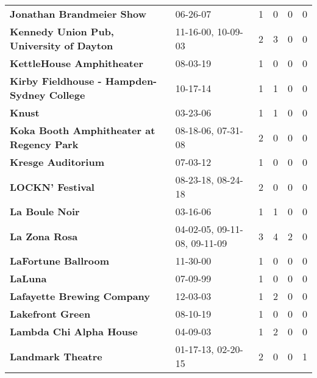 \begin{supertabular}{llllll}
                                    \textbf{Jonathan Brandmeier Show} &                      06-26-07 &  1 &   0 &  0 &  0 \\
                     \textbf{Kennedy Union Pub, University of Dayton} &            11-16-00, 10-09-03 &  2 &   3 &  0 &  0 \\
                                    \textbf{KettleHouse Amphitheater} &                      08-03-19 &  1 &   0 &  0 &  0 \\
                   \textbf{Kirby Fieldhouse - Hampden-Sydney College} &                      10-17-14 &  1 &   1 &  0 &  0 \\
                                                       \textbf{Knust} &                      03-23-06 &  1 &   1 &  0 &  0 \\
                     \textbf{Koka Booth Amphitheater at Regency Park} &            08-18-06, 07-31-08 &  2 &   0 &  0 &  0 \\
                                           \textbf{Kresge Auditorium} &                      07-03-12 &  1 &   0 &  0 &  0 \\
                                             \textbf{LOCKN' Festival} &            08-23-18, 08-24-18 &  2 &   0 &  0 &  0 \\
                                               \textbf{La Boule Noir} &                      03-16-06 &  1 &   1 &  0 &  0 \\
                                                \textbf{La Zona Rosa} &  04-02-05, 09-11-08, 09-11-09 &  3 &   4 &  2 &  0 \\
                                          \textbf{LaFortune Ballroom} &                      11-30-00 &  1 &   0 &  0 &  0 \\
                                                      \textbf{LaLuna} &                      07-09-99 &  1 &   0 &  0 &  0 \\
                                   \textbf{Lafayette Brewing Company} &                      12-03-03 &  1 &   2 &  0 &  0 \\
                                             \textbf{Lakefront Green} &                      08-10-19 &  1 &   0 &  0 &  0 \\
                                      \textbf{Lambda Chi Alpha House} &                      04-09-03 &  1 &   2 &  0 &  0 \\
                                            \textbf{Landmark Theatre} &            01-17-13, 02-20-15 &  2 &   0 &  0 &  1 \\

\end{supertabular}
